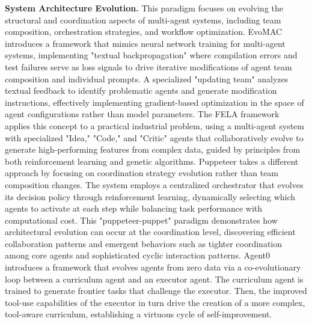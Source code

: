 \textbf{System Architecture Evolution.}
This paradigm focuses on evolving the structural and coordination aspects of multi-agent systems, including team composition, orchestration strategies, and workflow optimization. 
EvoMAC \citep{hu2024self} introduces a framework that mimics neural network training for multi-agent systems, implementing "textual backpropagation" where compilation errors and test failures serve as loss signals to drive iterative modifications of agent team composition and individual prompts. A specialized "updating team" analyzes textual feedback to identify problematic agents and generate modification instructions, effectively implementing gradient-based optimization in the space of agent configurations rather than model parameters. The FELA framework~\citep{wang2025fela} applies this concept to a practical industrial problem, using a multi-agent system with specialized "Idea," "Code," and "Critic" agents that collaboratively evolve to generate high-performing features from complex data, guided by principles from both reinforcement learning and genetic algorithms. Puppeteer \citep{dang2025multi} takes a different approach by focusing on coordination strategy evolution rather than team composition changes. The system employs a centralized orchestrator that evolves its decision policy through reinforcement learning, dynamically selecting which agents to activate at each step while balancing task performance with computational cost. This "puppeteer-puppet" paradigm demonstrates how architectural evolution can occur at the coordination level, discovering efficient collaboration patterns and emergent behaviors such as tighter coordination among core agents and sophisticated cyclic interaction patterns. Agent0~\citep{xia2025agent0} introduces a framework that evolves agents from zero data via a co-evolutionary loop between a curriculum agent and an executor agent. The curriculum agent is trained to generate frontier tasks that challenge the executor. Then, the improved tool-use capabilities of the executor in turn drive the creation of a more complex, tool-aware curriculum, establishing a virtuous cycle of self-improvement.

